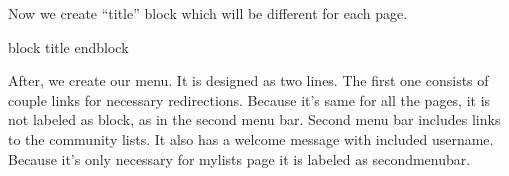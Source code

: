 \documentclass[letterpaper,10pt,english]{sphinxmanual}
\begin{document}
Now we create “title” block which will be different for each page.

\begin{sphinxVerbatim}[commandchars=\\\{\}]
\PYGZob{}\PYGZpc{} block title \PYGZpc{}\PYGZcb{}\PYGZob{}\PYGZpc{} endblock \PYGZpc{}\PYGZcb{}
\end{sphinxVerbatim}

After, we create our menu. It is designed as two lines. The first one consists of
couple links for necessary redirections. Because it’s same for all the pages, it is not
labeled as block, as in the second menu bar. Second menu bar includes links to the community lists.
It also has a welcome message with included username. Because it’s only necessary for mylists page
it is labeled as secondmenubar.
\end{document}
